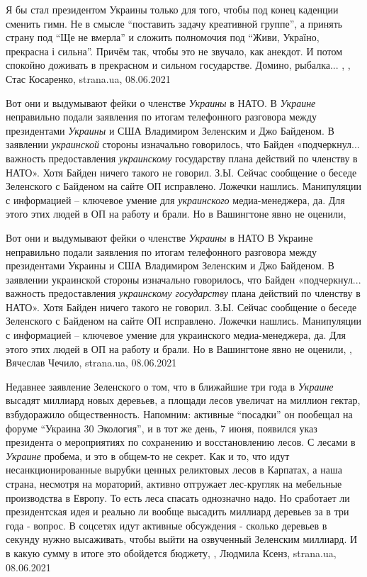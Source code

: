 Я бы стал президентом Украины только для того, чтобы под конец каденции сменить
гимн.  Не в смысле \enquote{поставить задачу креативной группе}, а принять
страну под \enquote{Ще не вмерла} и сложить полномочия под \enquote{Живи,
Україно, прекрасна і сильна}.  Причём так, чтобы это не звучало, как анекдот. И
потом спокойно доживать в прекрасном и сильном государстве. Домино, рыбалка... ,
, Стас Косаренко, strana.ua, 08.06.2021

Вот они и выдумывают фейки о членстве \emph{Украины} в НАТО.  В \emph{Украине} неправильно
подали заявления по итогам телефонного разговора между президентами \emph{Украины} и
США Владимиром Зеленским и Джо Байденом. В заявлении \emph{украинской} стороны
изначально говорилось, что Байден «подчеркнул... важность предоставления
\emph{украинскому} государству плана действий по членству в НАТО». Хотя Байден ничего
такого не говорил.  З.Ы. Сейчас сообщение о беседе Зеленского с Байденом на
сайте ОП исправлено. Ложечки нашлись.  Манипуляции с информацией – ключевое
умение для \emph{украинского} медиа-менеджера, да. Для этого этих людей в ОП на работу
и брали. Но в Вашингтоне явно не оценили,

Вот они и выдумывают фейки о членстве \emph{Украины} в НАТО В Украине
неправильно подали заявления по итогам телефонного разговора между президентами
Украины и США Владимиром Зеленским и Джо Байденом. В заявлении украинской
стороны изначально говорилось, что Байден «подчеркнул... важность
предоставления \emph{украинскому государству} плана действий по членству в
НАТО». Хотя Байден ничего такого не говорил.  З.Ы. Сейчас сообщение о беседе
Зеленского с Байденом на сайте ОП исправлено. Ложечки нашлись.  Манипуляции с
информацией – ключевое умение для украинского медиа-менеджера, да. Для этого
этих людей в ОП на работу и брали. Но в Вашингтоне явно не оценили,
, Вячеслав Чечило, strana.ua, 08.06.2021

Недавнее заявление Зеленского о том, что в ближайшие три года в \emph{Украине}
высадят миллиард новых деревьев, а площади лесов увеличат на миллион гектар,
взбудоражило общественность. Напомним: активные \enquote{посадки} он пообещал
на форуме \enquote{Украина 30 Экология}, и в тот же день, 7 июня, появился указ
президента о мероприятиях по сохранению и восстановлению лесов.  С лесами в
\emph{Украине} пробема, и это в общем-то не секрет. Как и то, что идут
несанкционированные вырубки ценных реликтовых лесов в Карпатах, а наша страна,
несмотря на мораторий, активно отгружает лес-кругляк на мебельные производства
в Европу.  То есть леса спасать однозначно надо. Но сработает ли президентская
идея и реально ли вообще высадить миллиард деревьев за в три года - вопрос.  В
соцсетях идут активные обсуждения - сколько деревьев в секунду нужно
высаживать, чтобы выйти на озвученный Зеленским миллиард. И в какую сумму в
итоге это обойдется бюджету,
, Людмила Ксенз, strana.ua, 08.06.2021

